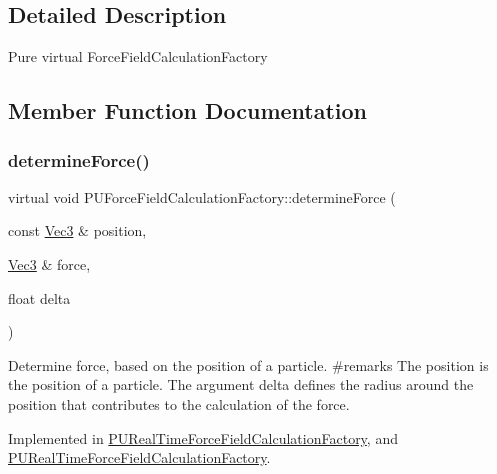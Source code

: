 \subsection{Detailed Description}
Pure virtual Force\+Field\+Calculation\+Factory 

\subsection{Member Function Documentation}
\mbox{\label{classPUForceFieldCalculationFactory_ab2ec33f744eccdd1301aa9c12a3f54f9}} 
\subsubsection{\texorpdfstring{determine\+Force()}{determineForce()}\hspace{0.1cm}{\footnotesize\ttfamily [1/2]}}
{\footnotesize\ttfamily virtual void P\+U\+Force\+Field\+Calculation\+Factory\+::determine\+Force (\begin{DoxyParamCaption}\item[{const \hyperlink{classVec3}{Vec3} \&}]{position,  }\item[{\hyperlink{classVec3}{Vec3} \&}]{force,  }\item[{float}]{delta }\end{DoxyParamCaption})\hspace{0.3cm}{\ttfamily [pure virtual]}}

Determine force, based on the position of a particle. \#remarks The position is the position of a particle. The argument \textquotesingle{}delta\textquotesingle{} defines the radius around the position that contributes to the calculation of the force. 

Implemented in \hyperlink{classPURealTimeForceFieldCalculationFactory_a77c8efbd2a6dcd7e5a25ee6bd48d8f6e}{P\+U\+Real\+Time\+Force\+Field\+Calculation\+Factory}, and \hyperlink{classPURealTimeForceFieldCalculationFactory_a8469774f9e5bdb65321f0955fb016670}{P\+U\+Real\+Time\+Force\+Field\+Calculation\+Factory}.

\mbox{\label{classPUForceFieldCalculationFactory_ab2ec33f744eccdd1301aa9c12a3f54f9}} 
